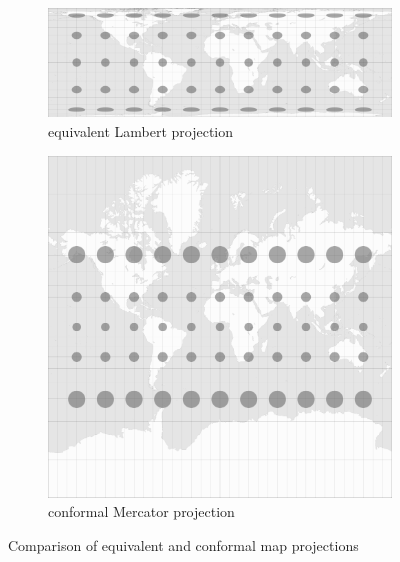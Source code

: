 \begin{figure}[ht]
  \vspace{1.5em}
  \centering
  \begin{subfigure}{0.59\textwidth}
    \centering
    \includegraphics[width=0.9\linewidth]{graphics/basics/hgis/projection_distortion_lambert.png}
    \caption{equivalent Lambert projection \protect\footnotemark}
  \end{subfigure}
  \begin{subfigure}{0.39\textwidth}
    \centering
    \includegraphics[width=0.9\linewidth]{graphics/basics/hgis/projection_distortion_mercator.png}
    \caption{conformal Mercator projection \protect\footnotemark}
  \end{subfigure}
  \caption{Comparison of equivalent and conformal map projections}
  \label{fig:lambert_vs_mercator}
\end{figure}

\addtocounter{footnote}{-1}

